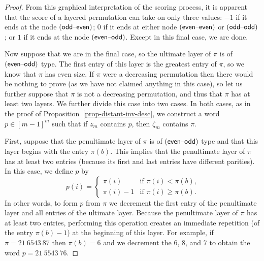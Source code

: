 \begin{proof}
	From this graphical interpretation of the scoring process, it is apparent that the score of a layered permutation can take on only three values: $-1$ if it ends at the node $(\textsf{odd}\text{--}\textsf{even})$; $0$ if it ends at either node $(\textsf{even}\text{--}\textsf{even})$ or $(\textsf{odd}\text{--}\textsf{odd})$; or $1$ if it ends at the node $(\textsf{even}\text{--}\textsf{odd})$. Except in this final case, we are done.

	Now suppose that we are in the final case, so the ultimate layer of $\pi$ is of $(\textsf{even}\text{--}\textsf{odd})$ type. The first entry of this layer is the greatest entry of $\pi$, so we know that $\pi$ has even size. If $\pi$ were a decreasing permutation then there would be nothing to prove (as we have not claimed anything in this case), so let us further suppose that $\pi$ is not a decreasing permutation, and thus that $\pi$ has at least two layers. We further divide this case into two cases. In both cases, as in the proof of Proposition~\ref{prop-distant-inv-desc}, we construct a word $p\in[m-1]^m$ such that if $z_m$ contains $p$, then $\zeta_m$ contains $\pi$.

	First, suppose that the penultimate layer of $\pi$ is of $(\textsf{even}\text{--}\textsf{odd})$ type and that this layer begins with the entry $\pi(b)$. This implies that the penultimate layer of $\pi$ has at least two entries (because its first and last entries have different parities). In this case, we define $p$ by
	\[
		p(i)
		=
		\left\{\begin{array}{ll}
			\pi(i)&\text{if $\pi(i)<\pi(b)$,}\\
			\pi(i)-1&\text{if $\pi(i)\ge\pi(b)$.}
		\end{array}\right.
	\]
	In other words, to form $p$ from $\pi$ we decrement the first entry of the penultimate layer and all entries of the ultimate layer. Because the penultimate layer of $\pi$ has at least two entries, performing this operation creates an immediate repetition (of the entry $\pi(b)-1$) at the beginning of this layer. For example, if $\pi=21\ 6543\ 87$ then $\pi(b)=6$ and we decrement the $6$, $8$, and $7$ to obtain the word $p=21\ 5543\ 76$.


\end{proof}
